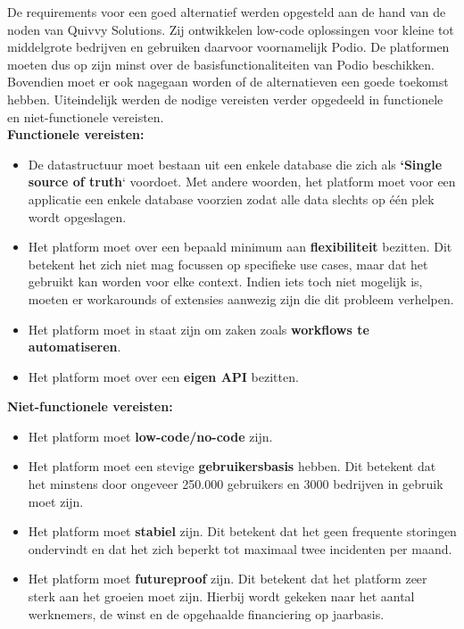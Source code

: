 De requirements voor een goed alternatief werden opgesteld aan de hand van de noden van Quivvy Solutions. Zij ontwikkelen low-code oplossingen voor kleine tot middelgrote bedrijven en gebruiken daarvoor voornamelijk Podio. De platformen moeten dus op zijn minst over de basisfunctionaliteiten van Podio beschikken. Bovendien moet er ook nagegaan worden of de alternatieven een goede toekomst hebben. Uiteindelijk werden de nodige vereisten verder opgedeeld in functionele en niet-functionele vereisten. \\

\textbf{Functionele vereisten:}

\begin{itemize}
    \item De datastructuur moet bestaan uit een enkele database die zich als \textbf{`Single source of truth}` voordoet. Met andere woorden, het platform moet voor een applicatie een enkele database voorzien zodat alle data slechts op één plek wordt opgeslagen.
    \item Het platform moet over een bepaald minimum aan \textbf{flexibiliteit} bezitten. Dit betekent het zich niet mag focussen op specifieke use cases, maar dat het gebruikt kan worden voor elke context. Indien iets toch niet mogelijk is, moeten er workarounds of extensies aanwezig zijn die dit probleem verhelpen.
    \item Het platform moet in staat zijn om zaken zoals \textbf{workflows te automatiseren}.
    \item Het platform moet over een \textbf{eigen API} bezitten.
\end{itemize}

\textbf{Niet-functionele vereisten:} 

\begin{itemize}
    \item Het platform moet \textbf{low-code/no-code} zijn.
    \item Het platform moet een stevige \textbf{gebruikersbasis} hebben. Dit betekent dat het minstens door ongeveer 250.000 gebruikers en 3000 bedrijven in gebruik moet zijn.
    \item Het platform moet \textbf{stabiel} zijn. Dit betekent dat het geen frequente storingen ondervindt en dat het zich beperkt tot maximaal twee incidenten per maand.
    \item Het platform moet \textbf{futureproof} zijn. Dit betekent dat het platform zeer sterk aan het groeien moet zijn. Hierbij wordt gekeken naar het aantal werknemers, de winst en de opgehaalde financiering op jaarbasis.
\end{itemize}


